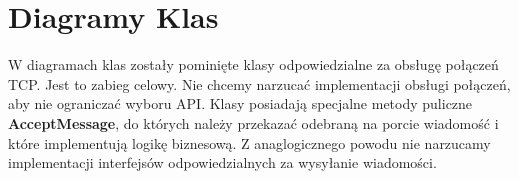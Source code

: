 \documentclass[../Dokumentacja.tex]{subfiles}
\begin{document}
\section{Diagramy Klas}
W diagramach klas zostały pominięte klasy odpowiedzialne za obsługę połączeń TCP.
Jest to zabieg celowy. Nie chcemy narzucać implementacji obsługi połączeń, aby
nie ograniczać wyboru API. Klasy posiadają specjalne metody puliczne \textbf{AcceptMessage},
do których należy przekazać odebraną na porcie wiadomość i które implementują
logikę biznesową. Z anaglogicznego powodu nie narzucamy implementacji interfejsów
odpowiedzialnych za wysyłanie wiadomości.



\end{document}
